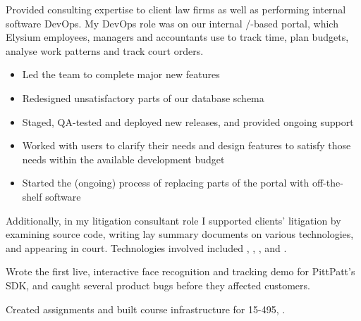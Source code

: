 Provided consulting expertise to client law firms as well as performing
internal software DevOps. My DevOps role was on our internal
/-based portal, which Elysium employees, managers and
accountants use to track
time, plan budgets, analyse work patterns and track court orders.

\begin{itemize}
\item Led the team to complete major new features
\item Redesigned unsatisfactory parts of our database schema
\item Staged, QA-tested and deployed new releases, and provided ongoing support
\item Worked with users to clarify their needs and design features to satisfy
those needs within the available development budget
\item Started the (ongoing) process of replacing parts of the portal
with off-the-shelf software
\end{itemize}

Additionally, in my litigation consultant role I supported clients' litigation
by examining source code, writing lay summary documents on various
technologies, and appearing in court. Technologies involved included
, , ,  and
.

Wrote the first live, interactive face recognition and tracking demo for
PittPatt's SDK, and caught several product bugs before they affected customers.

Created assignments and built course infrastructure for 15-495, .

